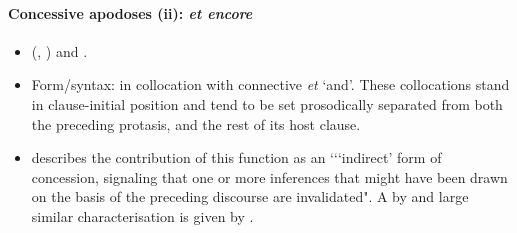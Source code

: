 \paragraph{Concessive apodoses (ii): \textit{et encore}}
\label{appendixFrenchEncoreConcessiveConsequent2}
\begin{itemize}
	\item \citeauthor{MosegaardHansen2002} (\citeyear{MosegaardHansen2002}, \citeyear[193–197]{MosegaardHansen2008}) and \textcite{VictorriFuchs1996}.
	\item Form/syntax: in collocation with connective \textit{et} \lq and'. These collocations stand in clause-initial position and tend to be set prosodically separated from both the preceding protasis, and the rest of its host clause.
	\item \textcite[195]{MosegaardHansen2008} describes the contribution of this function as an \lq\lq \lq indirect' form of concession, signaling that one or more inferences that might have been drawn on the basis of the preceding discourse are invalidated". A by and large similar characterisation is given by \textcite{VictorriFuchs1996}.
\end{itemize}
